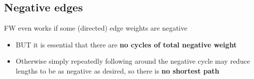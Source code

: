 \documentclass{article}
\begin{document}
\subsection{Negative edges}
\begin{flushleft}
FW even works if some (directed) edge weights are negative
\begin{itemize}
	\item BUT it is essential that there are \textbf{no cycles of total negative weight}
	\item Otherwise simply repeatedly following around the negative cycle may reduce lengths to be as negative as desired, so there is \textbf{no shortest path}
\end{itemize}
\end{flushleft}
\end{document}
